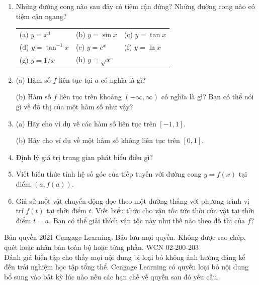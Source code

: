 \begin{minipage}[t]{0.485\textwidth}
\begin{enumerate}[label=\textbf{\arabic*.}, leftmargin=1.5em, start=6, itemsep=6pt, topsep=0pt]
    \item Những đường cong nào sau đây có tiệm cận đứng? Những đường cong nào có tiệm cận ngang?
    \par\vspace{2pt}
    \begingroup
    \setlength{\tabcolsep}{2pt}
    \begin{tabular}{@{}lll@{}}
        (a) $y = x^4$ & (b) $y = \sin x$ & (c) $y = \tan x$ \\[3pt]
        (d) $y = \tan^{-1} x$ \hspace{0.5em} & (e) $y = e^x$ \hspace{1em} & (f) $y = \ln x$ \\[3pt]
        (g) $y = 1/x$ & (h) $y = \sqrt{x}$ &
    \end{tabular}
    \endgroup

    \item (a) Hàm số $f$ liên tục tại $a$ có nghĩa là gì?
    \par\vspace{2pt}
    (b) Hàm số $f$ liên tục trên khoảng $(-\infty, \infty)$ có nghĩa là gì? Bạn có thể nói gì về đồ thị của một hàm số như vậy?

    \item (a) Hãy cho ví dụ về các hàm số liên tục trên $[-1, 1]$.
    \par\vspace{2pt}
    (b) Hãy cho ví dụ về một hàm số không liên tục trên $[0, 1]$.

    \item Định lý giá trị trung gian phát biểu điều gì?

    \item Viết biểu thức tính hệ số góc của tiếp tuyến với đường cong $y = f(x)$ tại điểm $(a, f(a))$.

    \item Giả sử một vật chuyển động dọc theo một đường thẳng với phương trình vị trí $f(t)$ tại thời điểm $t$. Viết biểu thức cho vận tốc tức thời của vật tại thời điểm $t = a$. Bạn có thể giải thích vận tốc này như thế nào theo đồ thị của $f$?
\end{enumerate}
\end{minipage}

\vfill
\begin{center}
{\fontsize{6.5}{8}\selectfont\color{gray!80!black}
Bản quyền 2021 Cengage Learning. Bảo lưu mọi quyền. Không được sao chép, quét hoặc nhân bản toàn bộ hoặc từng phần. WCN 02-200-203\\[1pt]
Đánh giá biên tập cho thấy mọi nội dung bị loại bỏ không ảnh hưởng đáng kể đến trải nghiệm học tập tổng thể. Cengage Learning có quyền loại bỏ nội dung bổ sung vào bất kỳ lúc nào nếu các hạn chế về quyền sau đó yêu cầu.
}
\end{center}
